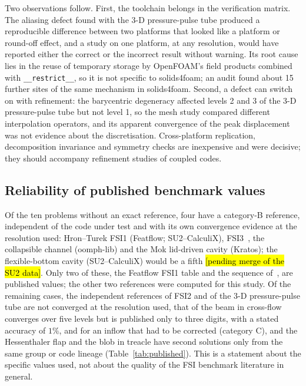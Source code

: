 Two observations follow.
First, the toolchain belongs in the verification matrix.
The aliasing defect found with the 3-D pressure-pulse tube produced a reproducible difference between two platforms that looked like a platform or round-off effect, and a study on one platform, at any resolution, would have reported either the correct or the incorrect result without warning.
Its root cause lies in the reuse of temporary storage by OpenFOAM's field products combined with \texttt{\_\_restrict\_\_}, so it is not specific to solids4foam; an audit found about 15 further sites of the same mechanism in solids4foam.
Second, a defect can switch on with refinement: the barycentric degeneracy affected levels 2 and 3 of the 3-D pressure-pulse tube but not level 1, so the mesh study compared different interpolation operators, and its apparent convergence of the peak displacement was not evidence about the discretisation.
Cross-platform replication, decomposition invariance and symmetry checks are inexpensive and were decisive; they should accompany refinement studies of coupled codes.

\subsection{Reliability of published benchmark values}\label{sec:published_reliability}

Of the ten problems without an exact reference, four have a category-B reference, independent of the code under test and with its own convergence evidence at the resolution used: Hron--Turek FSI1 (Featflow; SU2--CalculiX), FSI3~\citep{Failer2020}, the collapsible channel (oomph-lib) and the Mok lid-driven cavity (Kratos); the flexible-bottom cavity (SU2--CalculiX) would be a fifth \hl{[pending merge of the SU2 data]}.
Only two of these, the Featflow FSI1 table and the sequence of~\citet{Failer2020}, are published values; the other two references were computed for this study.
Of the remaining cases, the independent references of FSI2 and of the 3-D pressure-pulse tube are not converged at the resolution used, that of the beam in cross-flow converges over five levels but is published only to three digits, with a stated accuracy of $1\%$, and for an inflow that had to be corrected (category C), and the Hessenthaler flap and the blob in treacle have second solutions only from the same group or code lineage (Table~\ref{tab:published}).
This is a statement about the specific values used, not about the quality of the FSI benchmark literature in general.

